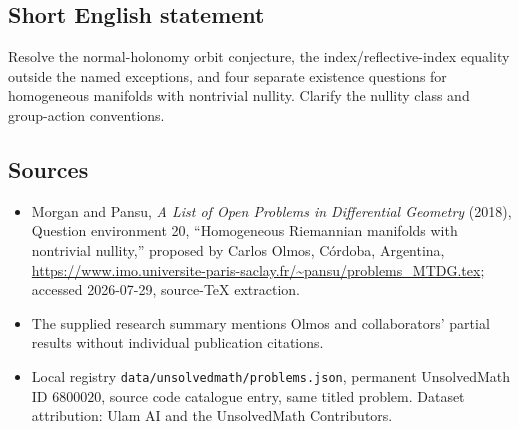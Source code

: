 \documentclass[11pt]{article}
\begin{document}
\subsection{Short English statement}
Resolve the normal-holonomy orbit conjecture, the index/reflective-index equality outside the named exceptions, and four separate existence questions for homogeneous manifolds with nontrivial nullity. Clarify the nullity class and group-action conventions.
\subsection{Sources}
\begin{itemize}
\item Morgan and Pansu, \emph{A List of Open Problems in Differential Geometry} (2018), Question environment 20, ``Homogeneous Riemannian manifolds with nontrivial nullity,'' proposed by Carlos Olmos, C\'ordoba, Argentina, \url{https://www.imo.universite-paris-saclay.fr/~pansu/problems_MTDG.tex}; accessed 2026-07-29, source-TeX extraction.
\item The supplied research summary mentions Olmos and collaborators' partial results without individual publication citations.
\item Local registry \texttt{data/unsolvedmath/problems.json}, permanent UnsolvedMath ID $6800020$, source code catalogue entry, same titled problem. Dataset attribution: Ulam AI and the UnsolvedMath Contributors.
\end{itemize}
\end{document}

